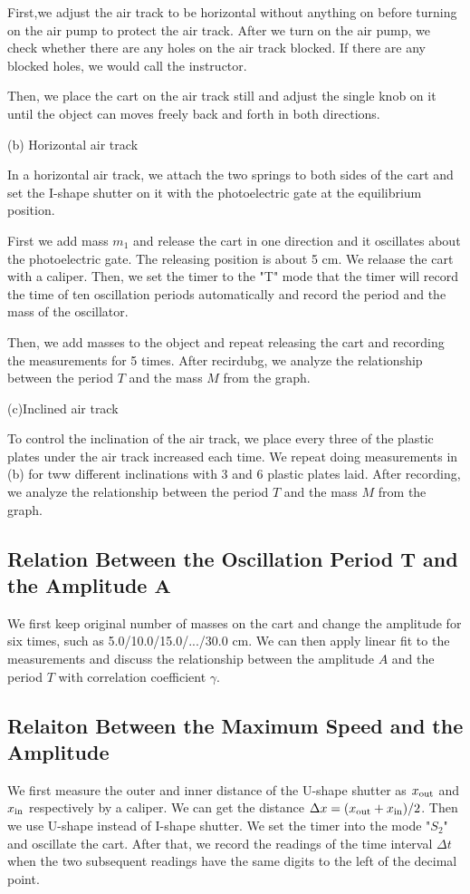 \documentclass[a4paper]{report}
\begin{document}
	First,we adjust the air track to be horizontal without anything on before turning on the air pump to protect the air track. After we turn on the air pump, we check whether there are any holes on the air track blocked. If there are any blocked holes, we would call the instructor.
	
	Then, we place the cart on the air track still and adjust the single knob on it until the object can moves freely back and forth in both directions.
	
	(b) Horizontal air track
	
	In a horizontal air track, we attach the two springs to both sides of the cart and set the I-shape shutter on it with the photoelectric gate at the equilibrium position.
	
	First we add mass $m_1$ and release the cart in one direction and it oscillates about the photoelectric gate. The releasing position is about 5 cm. We relaase the cart with a caliper. Then, we set the timer to the "T" mode that the timer will record the time of ten oscillation periods automatically and record the period and the mass of the oscillator.
	
	Then, we add masses to the object and repeat releasing the cart and recording the measurements for 5 times. After recirdubg, we analyze the relationship between the period $T$ and the mass $M$ from the graph.
	
	(c)Inclined air track
	
	To control the inclination of the air track, we place every three of the plastic plates under the air track increased each time. We repeat doing measurements in (b) for tww different inclinations with 3 and 6 plastic plates laid. After recording, we analyze the relationship between the period $T$ and the mass $M$ from the graph.
	\subsection{Relation Between the Oscillation Period $\bm{T}$ and the Amplitude $\bm{A}$}
	We first keep original number of masses on the cart and change the amplitude for six times, such as 5.0/10.0/15.0/.../30.0 cm. We can then apply linear fit to the measurements and discuss the relationship between the amplitude $A$ and the period $T$ with correlation coefficient $\gamma$.
	\subsection{Relaiton Between the Maximum Speed and the Amplitude}
	We first measure the outer and inner distance of the U-shape shutter as $x_{\rm{out}}$ and $x_{\rm{in}}$ respectively by a caliper. We can get the distance $\Delta x=(x_{\rm{out}}+x_{\rm{in}})/2$. Then we use U-shape instead of I-shape shutter. We set the timer into the mode "$S_2$" and oscillate the cart. After that, we record the readings of the time interval $\Delta t$ when the two subsequent readings have the same digits to the left of the decimal point.
	
\end{document}
